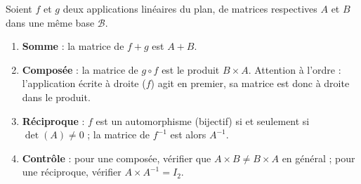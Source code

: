 \documentclass[11pt]{article}
\newcommand{\cle}[1]{{\popxbold\color{popdark}#1}}
\begin{document}
\begin{methode}
Soient $f$ et $g$ deux applications linéaires du plan, de matrices respectives $A$ et $B$ dans une même base $\mathcal{B}$.
\begin{enumerate}
\item \textbf{Somme} : la matrice de $f+g$ est $A+B$.
\item \textbf{Composée} : la matrice de $g\circ f$ est le produit $B\times A$. \cle{Attention à l'ordre} : l'application écrite à droite ($f$) agit en premier, sa matrice est donc à droite dans le produit.
\item \textbf{Réciproque} : $f$ est un automorphisme (bijectif) si et seulement si $\det(A)\neq 0$ ; la matrice de $f^{-1}$ est alors $A^{-1}$.
\item \textbf{Contrôle} : pour une composée, vérifier que $A\times B\neq B\times A$ en général ; pour une réciproque, vérifier $A\times A^{-1}=I_2$.
\end{enumerate}
\end{methode}
\end{document}
